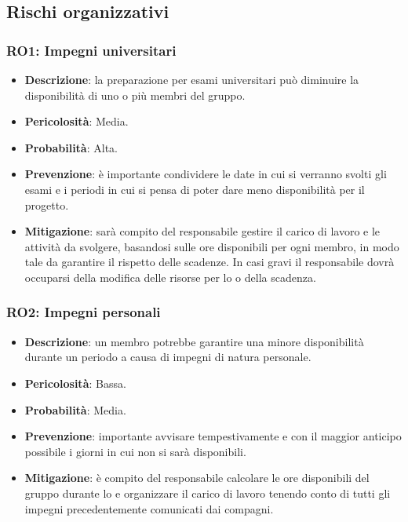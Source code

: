 \subsection{Rischi organizzativi}

\subsubsection{RO1: Impegni universitari}
\begin{itemize}
    \item \textbf{Descrizione}: la preparazione per esami universitari può diminuire la disponibilità di uno o più membri del gruppo.
    \item \textbf{Pericolosità}: Media.
    \item \textbf{Probabilità}: Alta.
    \item \textbf{Prevenzione}: è importante condividere le date in cui si verranno svolti gli esami e i periodi in cui si pensa di poter dare meno disponibilità per il progetto.
    \item \textbf{Mitigazione}: sarà compito del responsabile gestire il carico di lavoro e le attività da svolgere, basandosi sulle ore disponibili per ogni membro, in modo tale da garantire il rispetto delle scadenze. 
    In casi gravi il responsabile dovrà occuparsi della modifica delle risorse per lo  o della scadenza.
\end{itemize}

\subsubsection{RO2: Impegni personali}
\begin{itemize}
    \item \textbf{Descrizione}: un membro potrebbe garantire una minore disponibilità durante un periodo a causa di impegni di natura personale.
    \item \textbf{Pericolosità}: Bassa.
    \item \textbf{Probabilità}: Media.
    \item \textbf{Prevenzione}: importante avvisare tempestivamente e con il maggior anticipo possibile i giorni in cui non si sarà disponibili. 
    \item \textbf{Mitigazione}: è compito del responsabile calcolare le ore disponibili del gruppo durante lo  e organizzare il carico di lavoro tenendo conto di tutti gli impegni precedentemente comunicati dai compagni. 
\end{itemize}

